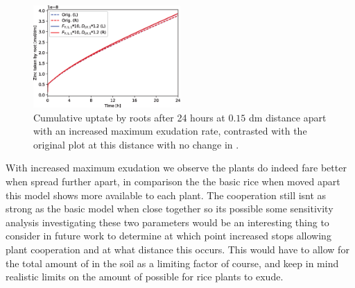 \documentclass[11pt]{article}
\numberwithin{equation}{section}
\begin{document}
 \begin{figure}[h]
    \centering
    \includegraphics[width=0.5\textwidth]{Figures/testpics/ZnCumulative/IncreasedDistanceandDMAZnCumu.eps}
    \caption{Cumulative  uptate by roots after 24 hours at $0.15$ \si{dm} distance apart with an increased maximum  exudation rate, contrasted with the original plot at this distance with no change in .}
\end{figure}
 With increased maximum  exudation we observe the plants do indeed fare better when spread further apart, in comparison the the basic rice when moved apart this model shows more available  to each plant. The cooperation still isnt as strong as the basic model when close together so its possible some sensitivity analysis investigating these two parameters would be an interesting thing to consider in future work to determine at which point increased  stops allowing plant cooperation and at what distance this occurs. This would have to allow for the total amount of  in the soil as a limiting factor of course, and keep in mind realistic limits on the amount of  possible for rice plants to exude. 
 
\end{document}

